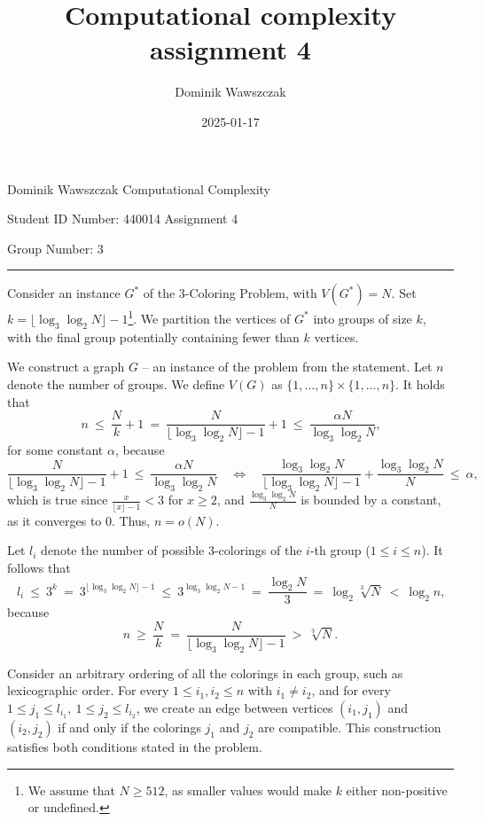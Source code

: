 \documentclass[12pt]{article}
\title{Computational complexity assignment 4}
\author{Dominik Wawszczak}
\date{2025-01-17}
\begin{document}
	\setlength{\parindent}{0 cm}
	
	Dominik Wawszczak \hfill Computational Complexity
	
	Student ID Number: 440014 \hfill Assignment 4
	
	Group Number: 3
	
	\bigskip
	\hrule
	\bigskip
	
	Consider an instance \(G^{\ast}\) of the \(3\)-Coloring Problem, with
	\(V(G^{\ast}) = N\). Set \(k = \lfloor \log_{3} \log_{2} N \rfloor -
	1\)\footnote{We assume that \(N \geqslant 512\), as smaller values would
	make \(k\) either non-positive or undefined.}. We partition the vertices of
	\(G^{\ast}\) into groups of size \(k\), with the final group potentially
	containing fewer than \(k\) vertices.
	
	\medskip
	
	We construct a graph \(G\) -- an instance of the problem from the statement.
	Let \(n\) denote the number of groups. We define \(V(G)\) as
	\(\{1, \ldots, n\} \times \{1, \ldots, n\}\). It holds that
	\[ n \ \leqslant \ \frac{N}{k} + 1 \ = \
	\frac{N}{\lfloor \log_{3} \log_{2} N \rfloor - 1} + 1 \ \leqslant \
	\frac{\alpha N}{\log_{3} \log_{2} N} \text{,} \]
	for some constant \(\alpha\), because
	\[ \frac{N}{\lfloor \log_{3} \log_{2} N \rfloor - 1} + 1 \ \leqslant \
	\frac{\alpha N}{\log_{3} \log_{2} N} \quad \iff \quad
	\frac{\log_{3} \log_{2} N}{\lfloor \log_{3} \log_{2} N \rfloor - 1} +
	\frac{\log_{3} \log_{2} N}{N} \ \leqslant \ \alpha \text{,} \]
	which is true since \(\frac{x}{\lfloor x \rfloor - 1} < 3\) for \(x
	\geqslant 2\), and \(\frac{\log_{3} \log_{2} N}{N}\) is bounded by a
	constant, as it converges to \(0\). Thus, \(n = o(N)\).
	
	\medskip
	
	Let \(l_{i}\) denote the number of possible \(3\)-colorings of the \(i\)-th
	group (\(1 \leqslant i \leqslant n\)). It follows that
	\[ l_{i} \ \leqslant \ 3^{k} \ = \
	3^{\lfloor \log_{3} \log_{2} N \rfloor - 1} \ \leqslant \
	3^{\log_{3} \log_{2} N - 1} \ = \ \frac{\log_{2} N}{3} \ = \
	\log_{2} \sqrt[3]{N} \ < \ \log_{2} n \text{,} \]
	because
	\[ n \ \geqslant \ \frac{N}{k} \ = \
	\frac{N}{\lfloor \log_{3} \log_{2} N \rfloor - 1} \ > \ \sqrt[3]{N}
	\text{.} \]
	
	\medskip
	
	Consider an arbitrary ordering of all the colorings in each group, such as
	lexicographic order. For every \(1 \leqslant i_{1}, i_{2} \leqslant n\) with
	\(i_{1} \neq i_{2}\), and for every \(1 \leqslant j_{1} \leqslant l_{i_{1}},
	\ 1 \leqslant j_{2} \leqslant l_{i_{2}}\), we create an edge between
	vertices \((i_{1}, j_{1})\) and \((i_{2}, j_{2})\) if and only if the
	colorings \(j_{1}\) and \(j_{2}\) are compatible. This construction
	satisfies both conditions stated in the problem.
	
\end{document}
